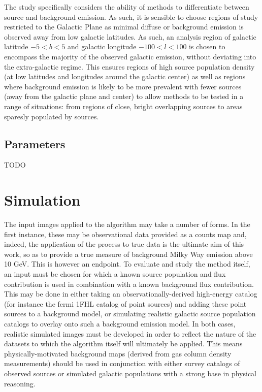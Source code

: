 \documentclass{PoS}
\begin{document}
The study specifically considers the ability of methods to differentiate between source and background emission. As such, it is sensible to choose regions of study restricted to the Galactic Plane as minimal diffuse or background emission is observed away from low galactic latitudes. As such, an analysis region of galactic latitude $-5 < b < 5$ and galactic longitude $-100 < l < 100$ is chosen to encompass the majority of the observed galactic emission, without deviating into the extra-galactic regime. This ensures regions of high source population density (at low latitudes and longitudes around the galactic center) as well as regions where background emission is likely to be more prevalent with fewer sources (away from the galactic plane and center) to allow methods to be tested in a range of situations: from regions of close, bright overlapping sources to areas sparesly populated by sources.

\subsection{Parameters}

TODO

\section{Simulation}


The input images applied to the algorithm may take a number of forms. In the first instance, these may be observational data provided as a counts map and, indeed, the application of the process to true data is the ultimate aim of this work, so as to provide a true measure of background Milky Way emission above 10 GeV. This is however an endpoint. To evaluate and study the method itself, an input must be chosen for which a known source population and flux contribution is used in combination with a known background flux contribution. This may be done in either taking an observationally-derived high-energy catalog (for instance the fermi 1FHL catalog of point sources) and adding these point sources to a background model, or simulating realistic galactic source population catalogs to overlay onto such a background emission model. In both cases, realistic simulated images must be developed in order to reflect the nature of the datasets to which the algorithm itself will ultimately be applied. This means physically-motivated background maps (derived from gas column density measurements) should be used in conjunction with either survey catalogs of observed sources or simulated galactic populations with a strong base in physical reasoning.
\end{document}
